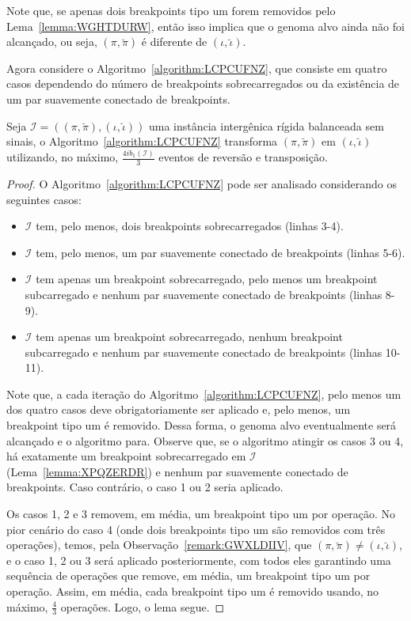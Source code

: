 \begin{remark}\label{remark:GWXLDIIV}
Note que, se apenas dois breakpoints tipo um forem removidos pelo Lema~\ref{lemma:WGHTDURW}, então isso implica que o genoma alvo ainda não foi alcançado, ou seja, $(\pi,\breve\pi)$ é diferente de $(\iota,\breve\iota)$.
\end{remark}

Agora considere o Algoritmo~\ref{algorithm:LCPCUFNZ}, que consiste em quatro casos dependendo do número de breakpoints sobrecarregados ou da existência de um par suavemente conectado de breakpoints.



\begin{lemma}\label{lemma:HIIRAXUH}
Seja $\mathcal{I} = ((\pi,\breve\pi),(\iota,\breve\iota))$ uma instância intergênica rígida balanceada sem sinais, o Algoritmo~\ref{algorithm:LCPCUFNZ} transforma $(\pi,\breve\pi)$ em $(\iota,\breve\iota)$ utilizando, no máximo, $\frac{4ib_1(\mathcal{I})}{3}$ eventos de reversão e transposição.
\end{lemma}
\begin{proof}
O Algoritmo~\ref{algorithm:LCPCUFNZ} pode ser analisado considerando os seguintes casos:
\begin{itemize}
  \item $\mathcal{I}$ tem, pelo menos, dois breakpoints sobrecarregados (linhas 3-4).
  \item $\mathcal{I}$ tem, pelo menos, um par suavemente conectado de breakpoints (linhas 5-6).
  \item $\mathcal{I}$ tem apenas um breakpoint sobrecarregado, pelo menos um breakpoint subcarregado e nenhum par suavemente conectado de breakpoints (linhas 8-9).
  \item $\mathcal{I}$ tem apenas um breakpoint sobrecarregado, nenhum breakpoint subcarregado e nenhum par suavemente conectado de breakpoints (linhas 10-11).
\end{itemize}
Note que, a cada iteração do Algoritmo~\ref{algorithm:LCPCUFNZ}, pelo menos um dos quatro casos deve obrigatoriamente ser aplicado e, pelo menos, um breakpoint tipo um é removido. Dessa forma, o genoma alvo eventualmente será alcançado e o algoritmo para. Observe que, se o algoritmo atingir os casos 3 ou 4, há exatamente um breakpoint sobrecarregado em $\mathcal{I}$ (Lema~\ref{lemma:XPQZERDR}) e nenhum par suavemente conectado de breakpoints. Caso contrário, o caso 1 ou 2 seria aplicado.

Os casos 1, 2 e 3 removem, em média, um breakpoint tipo um por operação. No pior cenário do caso 4 (onde dois breakpoints tipo um são removidos com três operações), temos, pela Observação~\ref{remark:GWXLDIIV}, que $(\pi,\breve\pi) \neq (\iota ,\breve\iota)$, e o caso 1, 2 ou 3 será aplicado posteriormente, com todos eles garantindo uma sequência de operações que remove, em média, um breakpoint tipo um por operação. Assim, em média, cada breakpoint tipo um é removido usando, no máximo, $\frac{4}{3}$ operações. Logo, o lema segue.
\end{proof}

